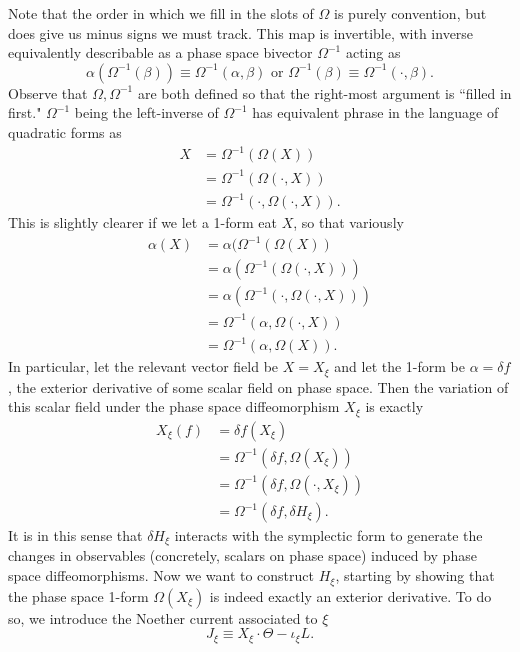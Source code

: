\documentclass[11pt,letterpaper]{article}
\newcommand{\LP}{\left(}
\newcommand{\RP}{\right)}
\begin{document}
Note that the order in which we fill in the slots of $\Omega$ is purely convention, but does give us minus signs we must track. This map is invertible, with inverse equivalently describable as a phase space bivector $\Omega^{-1}$ acting as \begin{equation}
\alpha \LP \Omega^{-1}(\beta) \RP \equiv \Omega^{-1}(\alpha, \beta) \mbox{ or } \Omega^{-1}(\beta) \equiv \Omega^{-1} \LP \cdot, \beta \RP.
\end{equation}
Observe that $\Omega, \Omega^{-1}$ are both defined so that the right-most argument is ``filled in first." $\Omega^{-1}$ being the left-inverse of $\Omega^{-1}$ has equivalent phrase in the language of quadratic forms as \begin{equation}
\begin{aligned}
X & = \Omega^{-1} (\Omega(X)) \\
& = \Omega^{-1} (\Omega(\cdot, X)) \\
& = \Omega^{-1} \LP \cdot, \Omega( \cdot, X) \RP.
\end{aligned}
\end{equation}
This is slightly clearer if we let a 1-form eat $X$, so that variously \begin{equation}
\begin{aligned}
\alpha(X) & = \alpha (\Omega^{-1} (\Omega(X)) \\
& = \alpha (\Omega^{-1} (\Omega( \cdot, X))) \\
& = \alpha (\Omega^{-1} (\cdot, \Omega(\cdot, X))) \\
& = \Omega^{-1} (\alpha, \Omega(\cdot, X)) \\
& = \Omega^{-1} (\alpha, \Omega(X)).
\end{aligned}
\end{equation}
In particular, let the relevant vector field be $X = X_\xi$ and let the 1-form be $\alpha = \delta f$, the exterior derivative of some scalar field on phase space. Then the variation of this scalar field under the phase space diffeomorphism $X_\xi$ is exactly \begin{equation}
\begin{aligned}
X_\xi (f) & = \delta f (X_\xi) \\
& = \Omega^{-1} (\delta f, \Omega(X_\xi)) \\
& = \Omega^{-1} (\delta f, \Omega( \cdot, X_\xi)) \\
& = \Omega^{-1} (\delta f, \delta H_\xi).
\end{aligned}
\end{equation}
It is in this sense that $\delta H_\xi$ interacts with the symplectic form to generate the changes in observables (concretely, scalars on phase space) induced by phase space diffeomorphisms. Now we want to construct $H_\xi$, starting by showing that the phase space 1-form $\Omega(X_\xi)$ is indeed exactly an exterior derivative. To do so, we introduce the Noether current associated to $\xi$ \begin{equation}
J_\xi \equiv X_\xi \cdot \Theta - \iota_\xi L.
\end{equation}
\end{document}
